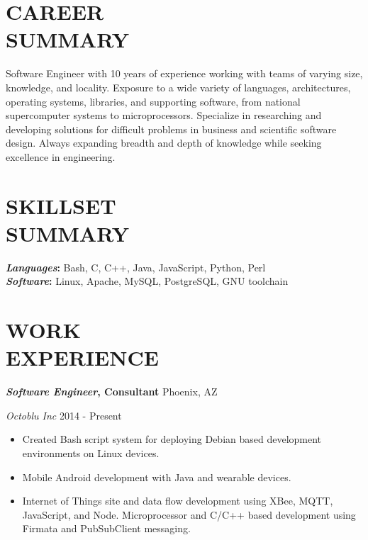 \documentclass[line,margin]{res}
\renewcommand{\headrulewidth}{0pt} %
\begin{document}
\thispagestyle{empty}


\renewcommand{\headrulewidth}{0pt}

\begin{resume}

  \section{CAREER\\SUMMARY}
  Software Engineer with 10 years of experience working with teams of varying size, knowledge, and locality.
  Exposure to a wide variety of languages, architectures, operating systems, libraries, and supporting
  software, from national supercomputer systems to microprocessors. Specialize in researching and developing
  solutions for difficult problems in business and scientific software design. Always expanding breadth and
  depth of knowledge while seeking excellence in engineering.

  \section{SKILLSET\\SUMMARY}
          {\bf \emph{Languages}:} Bash, C, C++, Java, JavaScript, Python, Perl\\ %
          {\bf \emph{Software}:} Linux, Apache, MySQL, PostgreSQL, GNU toolchain \\ %

  \section{WORK\\EXPERIENCE}
          {\bf \emph{Software Engineer}, Consultant} \hfill Phoenix, AZ

          {\sl Octoblu Inc} \hfill 2014 - Present
          \begin{itemize} \itemsep -2pt
          \item
            Created Bash script system for deploying Debian based development environments on Linux devices.
          \item
            Mobile Android development with Java and wearable devices.
          \item
            Internet of Things site and data flow development using XBee, MQTT, JavaScript, and Node.
            Microprocessor and C/C++ based development using Firmata and PubSubClient messaging.
          \end{itemize}


\end{resume}
\end{document}
